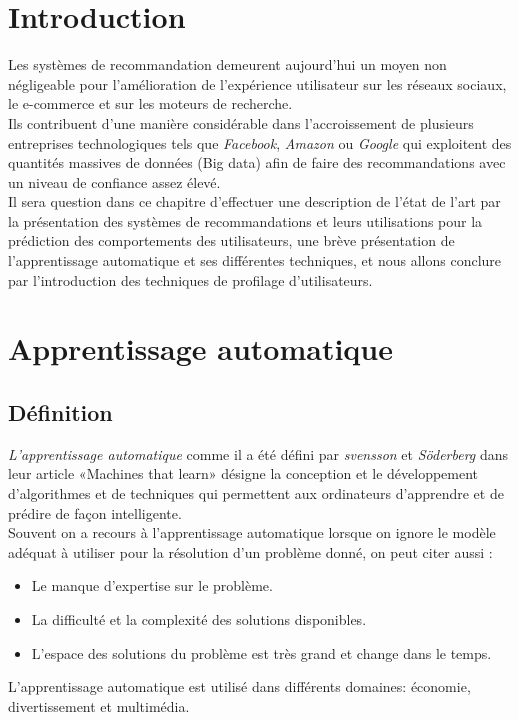 
\newpage
\section{Introduction}
Les systèmes de recommandation demeurent aujourd'hui un moyen non négligeable pour l'amélioration de l’expérience utilisateur sur les réseaux sociaux, le e-commerce et sur les moteurs de recherche.\\
Ils contribuent d'une manière considérable dans l'accroissement de plusieurs entreprises technologiques tels que \emph{Facebook}, \emph{Amazon} ou \emph{Google} qui exploitent des quantités massives de données (Big data) afin de faire des recommandations avec un niveau de confiance assez élevé.\\
Il sera question dans ce chapitre d’effectuer une description de l'état de l'art par la présentation des systèmes de recommandations et leurs utilisations pour la prédiction des comportements des utilisateurs, une brève présentation de l'apprentissage automatique et ses différentes techniques, et nous allons conclure par l'introduction des techniques de profilage d'utilisateurs.

\section{Apprentissage automatique}
    \subsection{Définition}
    \emph{L'apprentissage automatique} comme il a été défini par \emph{svensson} et \emph{Söderberg} dans leur article «Machines that learn»\cite{svensson} désigne la conception et le développement d'algorithmes et de techniques qui permettent aux ordinateurs d'apprendre et de prédire de façon intelligente.\\
    Souvent on a recours à l'apprentissage automatique lorsque on ignore le modèle adéquat à utiliser pour la résolution d'un problème donné, on peut citer aussi :
    \begin{itemize}
        \item Le manque d'expertise sur le problème.
        \item La difficulté et la complexité des solutions disponibles. 
        \item L'espace des solutions du problème est très grand et change dans le temps. 
    \end{itemize}
    L'apprentissage automatique est utilisé dans différents domaines: économie, divertissement et multimédia.

